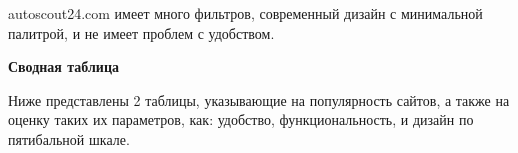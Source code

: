 \noindent
\begin{minipage}{\linewidth}
\end{minipage}
\bigskip

\noindent
\begin{minipage}{\linewidth}
\end{minipage}
\bigskip

autoscout24.com имеет много фильтров, современный дизайн с минимальной палитрой, и не имеет проблем с удобством.

\textbf{Сводная таблица}
\bigskip

Ниже представлены 2 таблицы, указывающие на популярность сайтов, а также на оценку таких их параметров, как: удобство, функциональность, и дизайн по пятибальной шкале.

